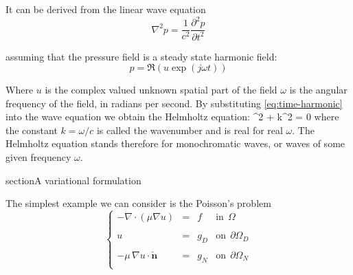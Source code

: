 It can be derived from the linear wave equation
\begin{equation}
       \nabla^2 p = \frac{1}{c^2}\frac{\partial^2 p}{\partial t^2}
\end{equation}

assuming that the pressure field is a steady state harmonic field:
\begin{equation}
       p = \Re\left(u \exp\left(j\omega t\right) \right)
       \label{eq:time-harmonic}
\end{equation}

Where $u$ is the complex valued unknown spatial part of the field $\omega$ is the angular 
frequency of the field, in radians per second. 
By substituting \ref{eq:time-harmonic} into the wave equation we obtain the Helmholtz equation:
\nabla^2  + k^2   = 0
where the constant $k= \omega/c$ is called the wavenumber and is real for real $\omega$. 
The Helmholtz equation stands therefore for monochromatic waves, or waves of some given frequency $\omega$.


section{A variational formulation}

The simplest example we can consider is the Poisson's problem
\begin{equation}
\left \{
\begin{array}{rcll}
-\nabla \cdot \left ( \mu \nabla{u} \right) & = & f & \mbox{in}~~\Omega \\
& & & \\
u & = & g_D & \mbox{on}~~\partial{\Omega}_D \\
& & & \\
-\mu\,\nabla{u}\cdot \check{\mathbf{n}} & = & g_N & \mbox{on}~~\partial{\Omega}_N \\
\end{array}
\right.
\end{equation}


